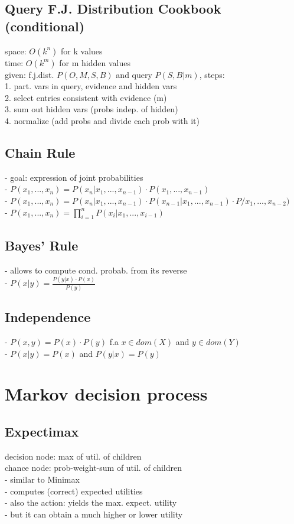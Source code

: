 \subsection*{Query F.J. Distribution Cookbook (conditional)}
space: $O(k^{n})$ for k values\\
time: $O(k^{m})$ for m hidden values\\
given: f.j.dist. $P(O, M, S, B)$ and query $P(S, B | m)$, steps:\\
1. part. vars in query, evidence and hidden vars\\
2. select entries consistent with evidence (m)\\
3. sum out hidden vars (probs indep. of hidden)\\
4. normalize (add probs and divide each prob with it)

\subsection*{Chain Rule}
- goal: expression of joint probabilities \\
- $P(x_1, ..., x_n) = P(x_n| x_1, ..., x_{n-1}) \cdot P(x_1,..., x_{n-1}) $\\
- $P(x_1, ..., x_n) = P(x_n| x_1, ..., x_{n-1}) \cdot P(x_{n-1}|x_1,..., x_{n-1}) \cdot P/x_1, ..., x_{n-2})$\\
- $P(x_1, ..., x_n) = \prod_{i=1}^{n} P(x_i | x_1, ..., x_{i-1})$

\subsection*{Bayes' Rule}
- allows to compute cond. probab. from its reverse \\
- $P(x | y) = \frac{P(y | x) \cdot P(x)}{P(y)}$

\subsection*{Independence}
- $P(x,y) = P(x) \cdot P(y)$ f.a $x \in dom(X)$ and $y \in dom(Y)$ \\
- $P(x | y) = P(x)$ and $P(y | x) = P(y)$


\section*{Markov decision process}
\subsection*{Expectimax}
decision node: max of util. of children \\
chance node: prob-weight-sum of util. of children \\
- similar to Minimax \\
- computes (correct) expected utilities \\
- also the action: yields the max. expect. utility \\
- but it can obtain a much higher or lower utility


